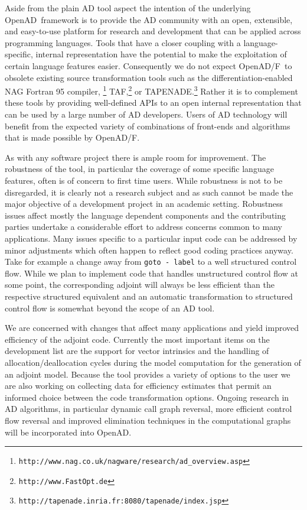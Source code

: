\documentclass{book}
\newcommand{\OpenADF}{OpenAD/F}
\newcommand{\OpenAD}{OpenAD}
\newcommand{\code}[1]{{\small\tt{#1}}}
\begin{document}
Aside from the plain AD tool aspect the intention of the 
underlying \OpenAD\  framework is to 
provide the AD community with 
an open, extensible, and easy-to-use platform for research and development
that can be applied across programming languages.
Tools that have a closer coupling with a language-specific, internal representation
have the potential to make the exploitation of certain language features easier. 
Consequently we do not expect \OpenADF\ to obsolete existing source transformation
tools such as  
the differentiation-enabled NAG Fortran 95 
compiler,
\footnote{\code{http://www.nag.co.uk/nagware/research/ad\_overview.asp}} 
TAF,\footnote{\code{http://www.FastOpt.de}} 
or TAPENADE.\footnote{\code{http://tapenade.inria.fr:8080/tapenade/index.jsp}} 
Rather it is to
complement these tools by providing well-defined APIs to an open internal 
representation that can be used by a large number of AD developers.
Users of AD technology will benefit from the expected
variety of combinations of front-ends and algorithms that is made possible
by \OpenADF.

As with any software project there is ample room for improvement.
The robustness of the tool, in particular the coverage of 
some specific language features, often is of concern to first 
time users. While robustness is not to be disregarded, it is clearly 
not a research subject and as such cannot be made the major 
objective of a development project in an academic setting. 
Robustness issues affect mostly the language dependent components 
and the contributing parties undertake a considerable effort to 
address concerns common to many applications. Many issues specific 
to a particular input code can be addressed by minor adjustments 
which often happen to reflect good coding practices anyway. 
Take for example a change away from 
\code{goto - label} to a well structured control flow. 
While we plan to  implement code that handles 
unstructured control flow at some point, the corresponding adjoint  will always
be less efficient than the respective structured equivalent and an 
automatic transformation to structured control flow is somewhat beyond the scope
of an AD tool.

We are concerned with changes that affect many applications and yield 
improved efficiency of the adjoint code.
Currently the most important items on the development list are the
support for vector intrinsics and the handling of allocation/deallocation cycles 
during the model computation for the generation of an adjoint model.
Because the tool provides a variety of options to the user we are also 
working on collecting data for efficiency estimates that permit 
an informed choice between the code transformation options. 
Ongoing research in AD algorithms, in particular dynamic call 
graph reversal, more efficient control flow reversal and 
improved elimination techniques in the computational graphs will 
be incorporated into \OpenAD. 
\end{document}
